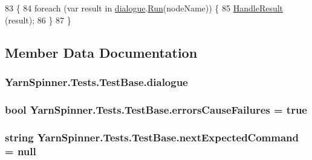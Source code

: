 \begin{DoxyCode}
83                                                                       \{
84             \textcolor{keywordflow}{foreach} (var result \textcolor{keywordflow}{in} \hyperlink{a00144_a4cff5de56c4b8a91c76b6eb2d622a795}{dialogue}.\hyperlink{a00070_aead84ee50cb113ca45724894290ce9c2}{Run}(nodeName)) \{
85                 \hyperlink{a00144_a7b525f85a26d7c942e1cbfa5d6453893}{HandleResult} (result);
86             \}
87         \}
\end{DoxyCode}


\subsection{Member Data Documentation}
\hypertarget{a00144_a4cff5de56c4b8a91c76b6eb2d622a795}{
\subsubsection[{dialogue}]{ Yarn\-Spinner.\-Tests.\-Test\-Base.\-dialogue\hspace{0.3cm}{\ttfamily [protected]}}}\label{a00144_a4cff5de56c4b8a91c76b6eb2d622a795}
\hypertarget{a00144_ac978fe85db843c51411f5517bdbe0eb8}{
\subsubsection[{errors\-Cause\-Failures}]{\setlength{\rightskip}{0pt plus 5cm}bool Yarn\-Spinner.\-Tests.\-Test\-Base.\-errors\-Cause\-Failures = true\hspace{0.3cm}{\ttfamily [protected]}}}\label{a00144_ac978fe85db843c51411f5517bdbe0eb8}
\hypertarget{a00144_a26fae5694fc06c3cdb12d3108dbc34de}{
\subsubsection[{next\-Expected\-Command}]{\setlength{\rightskip}{0pt plus 5cm}string Yarn\-Spinner.\-Tests.\-Test\-Base.\-next\-Expected\-Command = null\hspace{0.3cm}{\ttfamily [private]}}}\label{a00144_a26fae5694fc06c3cdb12d3108dbc34de}
